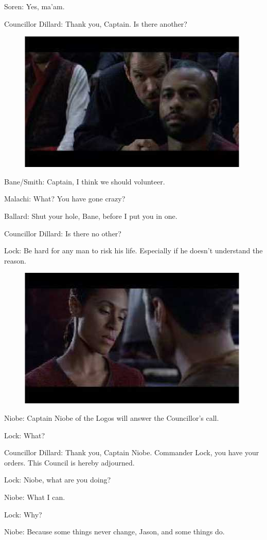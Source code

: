 \documentclass[UTF8]{ctexart}
\newenvironment{myquote}{\color{green} \setlength{\leftskip}{6em} \setlength{\rightskip}{4em} \setlength{\parindent}{-2em}}{\par}
\begin{document}
\begin{myquote}
Soren: Yes, ma'am.

Councillor Dillard: Thank you, Captain. Is there another?

\begin{figure}[htb]
\centering
\includegraphics[width=0.5\linewidth]{fig/read_reloaded-85}
\end{figure}

Bane/Smith: Captain, I think we should volunteer.

Malachi: What? You have gone crazy?

Ballard: Shut your hole, Bane, before I put you in one.

Councillor Dillard: Is there no other?

Lock: Be hard for any man to risk his life. Especially if he doesn't understand the reason.

\begin{figure}[htb]
\centering
\includegraphics[width=0.5\linewidth]{fig/read_reloaded-84}
\end{figure}

Niobe: Captain Niobe of the Logos will answer the Councillor's call.

Lock: What?

Councillor Dillard: Thank you, Captain Niobe. Commander Lock, you have your orders. This Council is hereby adjourned.

Lock: Niobe, what are you doing?

Niobe: What I can.

Lock: Why?

Niobe: Because some things never change, Jason, and some things do.
\end{myquote}
\end{document}
